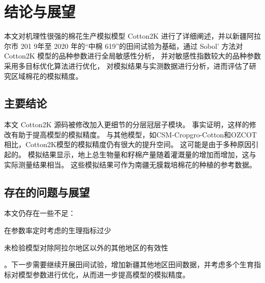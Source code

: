 \chapter{结论与展望}
本文对机理性很强的棉花生产模拟模型 Cotton2K 进行了详细阐述，并以新疆阿拉尔市 201 9年至 2020 年的“中棉 619”的田间试验为基础，通过 Sobol' 方法对 Cotton2K 模型的品种参数进行全局敏感性分析，%
并对敏感性指数较大的品种参数采用多目标优化算法进行优化，%
对模拟结果与实测数据进行分析，进而评估了研究区域棉花的模拟精度。

\section{主要结论}

本文 Cotton2K 源码被修改加入更细节的分层冠层子模块。%
事实证明，这样的修改有助于提高模型的模拟精度。
与其他模型，如CSM-Cropgro-Cotton和OZCOT相比，Cotton2K模型的模拟精度仍有很大的提升空间。%
这可能是由于多种原因引起的。%
模拟结果显示，地上总生物量和籽棉产量随着灌溉量的增加而增加，这与实际测量结果相当。%
这些模拟结果可作为南疆无膜栽培棉花的种植的参考数据。

\section{存在的问题与展望}

本文仍存在一些不足：
\begin{enumerate*}
    \item 在参数率定时考虑的生理指标过少
    \item 未检验模型对除阿拉尔地区以外的其他地区的有效性
\end{enumerate*}。下一步需要继续开展田间试验，增加新疆其他地区田间数据，并考虑多个生育指标对模型参数进行优化，从而进一步提高模型的模拟精度。